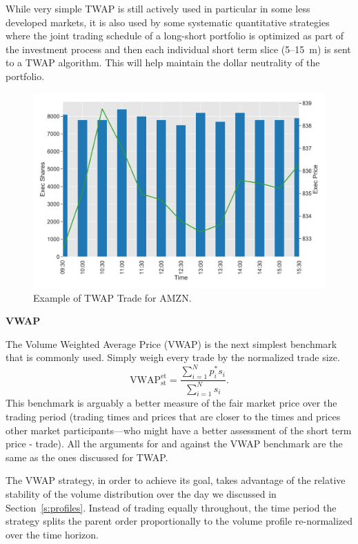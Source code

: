 While very simple TWAP is still actively used in particular in some less developed markets, it is also used by some systematic quantitative strategies where the joint trading schedule of a long-short portfolio is optimized as part of the investment process and then each individual short term slice (5--15~m) is sent to a TWAP algorithm. This will help maintain the dollar neutrality of the portfolio. \twomedskip

        \begin{figure}[!ht]
        \centering
        \includegraphics[width=\textwidth]{chapters/chapter_exec_models/figures/twap.png} 
        \caption{Example of TWAP Trade for AMZN. \label{fig:vwap}}
        \end{figure}


\noindent\textbf{VWAP} \twomedskip


The Volume Weighted Average Price (VWAP) is the next simplest benchmark that is commonly used. Simply weigh every trade by the normalized trade size.
        \begin{equation} \label{eq:vwapstet}
        \text{VWAP}_{\text{st}} ^{\text{et}}= \dfrac{ \sum_{i=1}^N p_i^* s_i }{ \sum_{i=1}^N s_i }.
        \end{equation}
This benchmark  is arguably a better measure of the fair market price over the trading period (trading times and prices that are closer to the times and prices other market participants---who might have a better assessment of the short term price - trade). All the arguments for and against the VWAP benchmark are the same as the ones discussed for TWAP. 


The VWAP strategy, in order to achieve its goal, takes advantage of the relative stability of the volume distribution over the day we discussed in Section~\ref{s:profiles}. Instead of trading equally throughout, the time period the strategy splits the parent order proportionally to the volume profile re-normalized over the time horizon.


